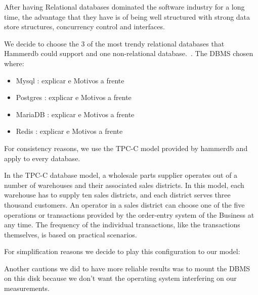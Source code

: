 After having Relational databases dominated the software industry for a long time, the advantage that they have is of being well structured with strong data store structures, concurrency control and interfaces. 

We decide to choose the 3 of the most trendy relational databases that Hammerdb could support and one non-relational database.~\cite{DBR}.
The DBMS chosen where:
\begin{itemize}
  \item Mysql : explicar e Motivos a frente
  \item Postgres : explicar e Motivos a frente
  \item MariaDB : explicar e Motivos a frente
  \item Redis : explicar e Motivos a frente
\end{itemize}

For consistency reasons, we use the TPC-C model provided by hammerdb and apply to every database. 

In the TPC-C database model, a wholesale parts supplier operates out of a number of warehouses and their associated sales districts. 
In this model, each warehouse has to supply ten sales districts, and each district serves three thousand customers. An operator in a sales district can choose one of the five operations or transactions provided by the order-entry system of the Business at any time.  The frequency of the individual transactions, like the transactions themselves, is based on practical scenarios.

For simplification reasons we decide to play this configuration to our model:




Another cautions we did to have more reliable results was to mount the DBMS on this disk because we don't want the operating system interfering on our measurements.
